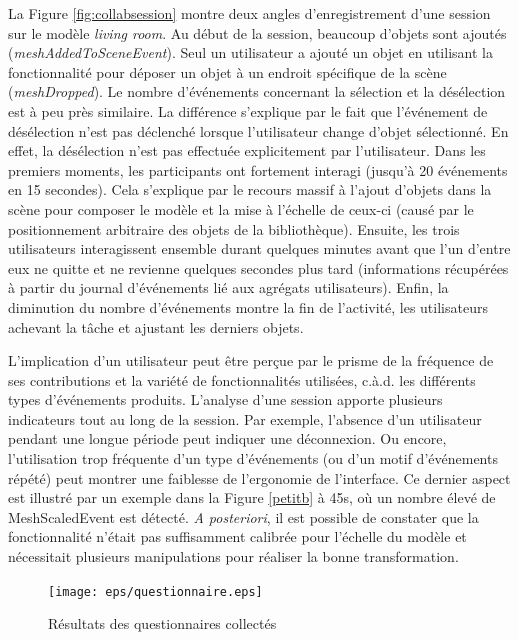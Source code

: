 La Figure \ref{fig:collabsession} montre deux angles d'enregistrement d'une session 
sur le modèle \textit{living room}. Au début de la session, beaucoup d'objets sont 
ajoutés (\textit{meshAddedToSceneEvent}). Seul un utilisateur a ajouté un objet 
en utilisant la fonctionnalité pour déposer un objet à un endroit spécifique de la 
scène (\textit{meshDropped}). Le nombre d'événements concernant la sélection et 
la désélection est à peu près similaire. La différence s'explique par 
le fait que l'événement de désélection n'est pas déclenché lorsque l'utilisateur 
change d'objet sélectionné. En effet, la désélection n'est pas effectuée 
explicitement par l'utilisateur. 
Dans les premiers moments, les participants ont fortement interagi 
(jusqu'à 20 événements en 15 secondes). Cela s'explique par le recours massif à 
l'ajout d'objets dans la scène pour composer le modèle et la mise à l'échelle de 
ceux-ci (causé par le positionnement arbitraire des objets de la bibliothèque). 
Ensuite, les trois utilisateurs interagissent ensemble durant quelques
minutes avant que l'un d'entre 
eux ne quitte et ne revienne quelques secondes plus tard (informations 
récupérées à partir du journal d'événements lié aux agrégats utilisateurs). Enfin, la diminution du nombre d'événements montre la fin de l'activité, les utilisateurs achevant 
la tâche et ajustant les derniers objets.

L'implication d'un utilisateur peut être perçue par le prisme de la fréquence de ses 
contributions et la variété de fonctionnalités utilisées, c.à.d. les différents 
types d'événements produits. L'analyse d'une session apporte plusieurs indicateurs 
tout au long de la session. Par exemple, l'absence d'un utilisateur pendant une 
longue période peut indiquer une déconnexion. Ou encore, l'utilisation trop 
fréquente d'un type d'événements (ou d'un motif d'événements répété) peut montrer 
une faiblesse de l'ergonomie de l'interface. Ce dernier aspect est illustré par un exemple dans la Figure \ref{petitb} à 45s, où un nombre élevé de 
MeshScaledEvent est détecté. \textit{A posteriori}, il est possible de constater  
que la fonctionnalité n'était pas suffisamment calibrée pour l'échelle du modèle et 
nécessitait plusieurs manipulations pour réaliser la bonne transformation.

	\begin{figure}[]
		\centering
		\texttt{[image: eps/questionnaire.eps]} 
		\caption{Résultats des questionnaires collectés}
		\label{fig:questionnaire}
	\end{figure}


